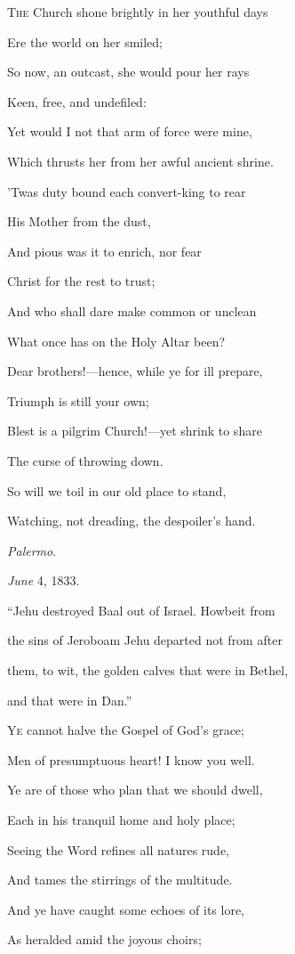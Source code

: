 T\textsc{he} Church shone brightly in her youthful
days

Ere the
world on her smiled;

So now, an outcast, she would pour her rays

Keen,
free, and undefiled:

Yet would I not that arm of force were mine,

Which thrusts her from her awful ancient shrine.

'Twas duty bound each convert-king to rear

His
Mother from the dust,

And pious was it to enrich, nor fear

Christ
for the rest to trust;

And who shall dare make common or unclean

What once has on the Holy Altar been?

Dear brothers!—hence, while ye for ill prepare,

Triumph
is still your own;

Blest is a pilgrim Church!—yet shrink to share

The
curse of throwing down.

So will we toil in our old place to stand,

Watching, not dreading, the despoiler's hand.

\emph{Palermo}.

\emph{June} 4, 1833.


``Jehu destroyed Baal out of Israel. Howbeit from

the sins of Jeroboam Jehu departed not from after

them, to wit, the golden calves that were in Bethel,

and that were in Dan.''

Y\textsc{e} cannot halve the Gospel of God's grace;

Men of presumptuous heart! I know you well.

Ye are of those who plan that we should dwell,

Each in his tranquil home and holy place;

Seeing the Word refines all natures rude,

And tames the stirrings of the multitude.

And ye have caught some echoes of its lore,

As heralded amid the joyous choirs;

